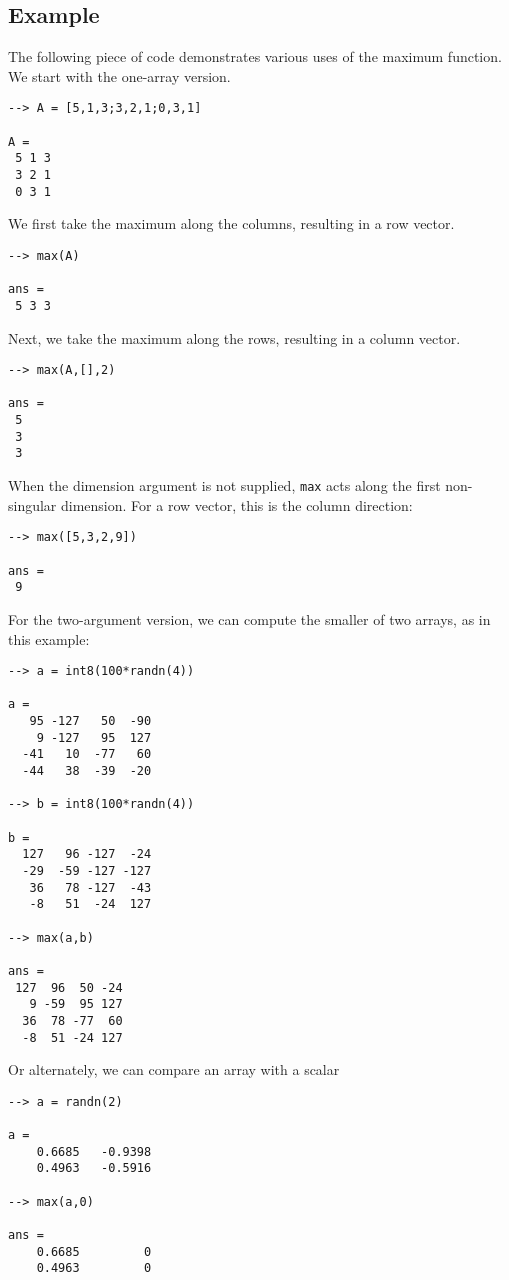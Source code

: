 \subsection{Example}

The following piece of code demonstrates various uses of the maximum
function.  We start with the one-array version.
\begin{verbatim}
--> A = [5,1,3;3,2,1;0,3,1]

A = 
 5 1 3 
 3 2 1 
 0 3 1 
\end{verbatim}
We first take the maximum along the columns, resulting in a row vector.
\begin{verbatim}
--> max(A)

ans = 
 5 3 3 
\end{verbatim}
Next, we take the maximum along the rows, resulting in a column vector.
\begin{verbatim}
--> max(A,[],2)

ans = 
 5 
 3 
 3 
\end{verbatim}
When the dimension argument is not supplied, \verb|max| acts along the first non-singular dimension.  For a row vector, this is the column direction:
\begin{verbatim}
--> max([5,3,2,9])

ans = 
 9 
\end{verbatim}

For the two-argument version, we can compute the smaller of two arrays,
as in this example:
\begin{verbatim}
--> a = int8(100*randn(4))

a = 
   95 -127   50  -90 
    9 -127   95  127 
  -41   10  -77   60 
  -44   38  -39  -20 

--> b = int8(100*randn(4))

b = 
  127   96 -127  -24 
  -29  -59 -127 -127 
   36   78 -127  -43 
   -8   51  -24  127 

--> max(a,b)

ans = 
 127  96  50 -24 
   9 -59  95 127 
  36  78 -77  60 
  -8  51 -24 127 
\end{verbatim}
Or alternately, we can compare an array with a scalar
\begin{verbatim}
--> a = randn(2)

a = 
    0.6685   -0.9398 
    0.4963   -0.5916 

--> max(a,0)

ans = 
    0.6685         0 
    0.4963         0 
\end{verbatim}
